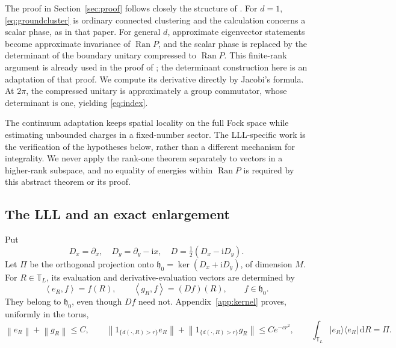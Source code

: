 \documentclass[11pt]{article}
\theoremstyle{definition}
\theoremstyle{remark}
\newcommand{\ii}{\mathrm i}
\newcommand{\dd}{\,\mathrm d}
\newcommand{\Ran}{\operatorname{Ran}}
\newcommand{\TT}{\mathbb T}
\newcommand{\norm}[1]{\left\lVert#1\right\rVert}
\newcommand{\ip}[2]{\left\langle#1,#2\right\rangle}
\begin{document}
The proof in Section~\ref{sec:proof} follows closely the structure of
\cite[Section~4]{BBDF19}. For \(d=1\), \eqref{eq:groundcluster} is ordinary connected
clustering and the calculation concerns a scalar phase, as in that
paper.  For general \(d\), approximate eigenvector statements become
approximate invariance of \(\Ran P\), and the scalar phase is replaced
by the determinant of the boundary unitary compressed to \(\Ran P\).
This finite-rank argument is already used in the proof of
\cite[Theorem~3.2, Section~4]{BBDF21}; the determinant construction
here is an adaptation of that proof.  We compute its derivative
directly by Jacobi's formula.  At \(2\pi\), the compressed unitary
is approximately a group commutator, whose determinant is one,
yielding \eqref{eq:index}.

The continuum adaptation keeps spatial locality on the full Fock
space while estimating unbounded charges in a fixed-number sector.
The LLL-specific work is the verification of the hypotheses below,
rather than a different mechanism for integrality.  We never apply
the rank-one theorem separately to vectors in a higher-rank subspace,
and no equality of energies within \(\Ran P\) is required by this
abstract theorem or its proof.

\subsection{The LLL and an exact enlargement}

Put
\[
 D_x=\partial_x,\quad D_y=\partial_y-\ii x,\quad
 D=\tfrac12(D_x-\ii D_y).
\]
Let \(\Pi\) be the orthogonal projection onto
\(\mathfrak h_0=\ker(D_x+\ii D_y)\), of dimension \(M\).
For \(R\in\TT_L\), its evaluation and derivative-evaluation vectors
are determined by
\[
 \ip{e_R}f=f(R),\qquad \ip{g_R}f=(Df)(R),\qquad f\in\mathfrak h_0.
\]
They belong to \(\mathfrak h_0\), even though \(Df\) need not.
Appendix~\ref{app:kernel} proves, uniformly in the torus,
\begin{equation}\label{eq:tails}
 \norm{e_R}+\norm{g_R}\le C,\qquad
 \norm{1_{\{d(\cdot,R)>r\}}e_R}
 +\norm{1_{\{d(\cdot,R)>r\}}g_R}\le Ce^{-cr^2},
 \qquad
 \int_{\TT_L}|e_R\rangle\langle e_R|\dd R=\Pi.
\end{equation}
\end{document}
